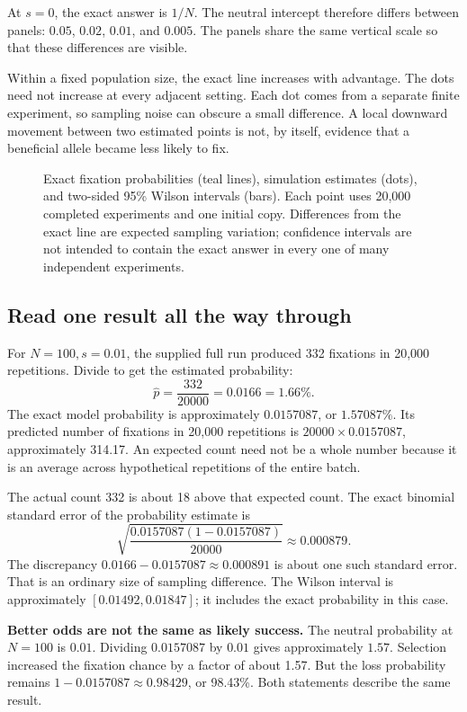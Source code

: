 At \(s=0\), the exact answer is \(1/N\). The neutral intercept therefore differs between panels: \(0.05\), \(0.02\), \(0.01\), and \(0.005\). The panels share the same vertical scale so that these differences are visible.

Within a fixed population size, the exact line increases with advantage. The dots need not increase at every adjacent setting. Each dot comes from a separate finite experiment, so sampling noise can obscure a small difference. A local downward movement between two estimated points is not, by itself, evidence that a beneficial allele became less likely to fix.

\begin{figure}[p]
\centering

\caption{Exact fixation probabilities (teal lines), simulation estimates (dots), and two-sided 95\% Wilson intervals (bars). Each point uses 20,000 completed experiments and one initial copy. Differences from the exact line are expected sampling variation; confidence intervals are not intended to contain the exact answer in every one of many independent experiments.}
\label{fig:fixation}
\end{figure}
\clearpage

\subsection{Read one result all the way through}
For \(N=100,s=0.01\), the supplied full run produced 332 fixations in 20,000 repetitions. Divide to get the estimated probability:
\[
\widehat p=\frac{332}{20000}=0.0166=1.66\%.
\]
The exact model probability is approximately \(0.0157087\), or \(1.57087\%\). Its predicted number of fixations in 20,000 repetitions is \(20000\times0.0157087\), approximately 314.17. An expected count need not be a whole number because it is an average across hypothetical repetitions of the entire batch.

The actual count 332 is about 18 above that expected count. The exact binomial standard error of the probability estimate is
\[
\sqrt{\frac{0.0157087(1-0.0157087)}{20000}}\approx0.000879.
\]
The discrepancy \(0.0166-0.0157087\approx0.000891\) is about one such standard error. That is an ordinary size of sampling difference. The Wilson interval is approximately \([0.01492,0.01847]\); it includes the exact probability in this case.

\begin{workedexample}
\textbf{Better odds are not the same as likely success.} The neutral probability at \(N=100\) is \(0.01\). Dividing \(0.0157087\) by \(0.01\) gives approximately \(1.57\). Selection increased the fixation chance by a factor of about 1.57. But the loss probability remains \(1-0.0157087\approx0.98429\), or 98.43\%. Both statements describe the same result.
\end{workedexample}

